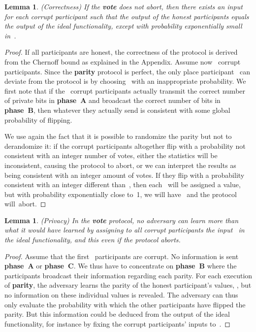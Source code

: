 \documentclass[11pt]{article}
\newtheorem{lemma}[theorem]{Lemma}
\begin{document}
\begin{lemma}(Correctness)
\label{lem:correctness corrupt} If the \textbf{vote} does not abort,
then there exists an input for each corrupt participant such that
the output of the honest participants equals the output of the ideal
functionality, except with probability exponentially small in~.
\end{lemma}



\begin{proof}
If all participants are honest, the correctness of the protocol is
derived from the Chernoff bound  as explained in the Appendix.
Assume now~ corrupt participants. Since the \textbf{parity}
protocol is perfect, the only place participant~ can deviate from
the protocol is by choosing~ with an inappropriate probability.
We first note that if the~ corrupt participants actually transmit
the correct number of private bits in \textbf{phase~A} and broadcast
the correct number of bits in \textbf{phase~B}, then whatever they
actually send is consistent with some global probability of
flipping.

We use again the fact that it is possible to randomize the parity
but not to derandomize it: if the corrupt participants altogether
flip with a probability not consistent with an integer number of
votes, either the statistics will be inconsistent, causing the
protocol to abort, or we can interpret the results as being
consistent with an integer amount of votes. If they flip with a
probability consistent with an integer different than~, then
each~ will  be assigned a value, but with probability
exponentially close to~1, we will have~
and the protocol will~abort.
\end{proof}


\begin{lemma}(Privacy)
\label{lem:privacy} In the \textbf{vote} protocol, no adversary can
learn more than what it would have learned by assigning to all
corrupt participants the input~ in the ideal functionality, and
this even if the protocol aborts.
\end{lemma}

\begin{proof}
Assume that the first~ participants are corrupt. No information
is sent \textbf{phase~A} or \textbf{phase~C}. We thus have to
concentrate on \textbf{phase~B} where the participants broadcast
their information regarding each parity. For each execution of
\textbf{parity}, the  adversary learns the parity of the honest
participant's values, , but no information on these individual values is revealed.
The adversary can thus only evaluate the probability with which the
other participants have flipped the parity. But this information
could be deduced from the output of the ideal functionality, for
instance by fixing the corrupt participants' inputs to~.
\end{proof}
\end{document}
